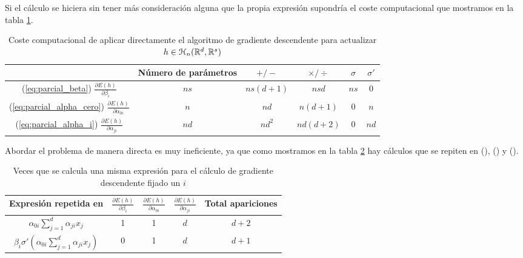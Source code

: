 Si el cálculo se hiciera sin tener más consideración alguna que la propia expresión supondría el coste computacional que mostramos en la tabla \ref{tab:coste-computacional-directa}.

\begin{table}[H]
    \begin{center}
    \begin{tabular}{| c | c | c | c | c | c| }
    \hline
       & Número de parámetros & $+ / -$ & $\times / \div$ & $\sigma$ & $\sigma'$
    \\ \hline
    (\ref{eq:parcial_beta}) $\frac{\partial E(h)}{\partial \beta_i}$ 
    & $n s$ & $n s (d+1)$ & $n s d$ & $n s$ & 0
    \\
    \hline
    (\ref{eq:parcial_alpha_cero}) $\frac{\partial E(h)}{\partial \alpha_{0 i}}$ 
    & $n$ & $n d$ & $n (d + 1)$ & 0 & $n$
    \\
    \hline
    (\ref{eq:parcial_alpha_i}) $\frac{\partial E(h)}{\partial \alpha_{j i}}$ 
    & $n d$ & $n d^2$ & $n d (d + 2)$ & 0 & $n d$
    \\
    \hline
    \end{tabular}
    \caption{Coste computacional de aplicar directamente el  algoritmo de gradiente 
    descendente para actualizar $h \in \mathcal{H}_n(\mathbb{R}^d, \mathbb{R}^s)$}
    \label{tab:coste-computacional-directa}
    \end{center}
\end{table}

Abordar el problema de manera directa es muy ineficiente, ya que como mostramos en la tabla 
\ref{tab:expresiones_repetidas_en_descenso_gradiente}
hay cálculos que se repiten en (), () y  
(). 

\begin{table}[H]
    \begin{center}
    \begin{tabular}{| c | c | c | c | c| }
    \hline
    Expresión  repetida en 
    & $\frac{\partial E(h)}{\partial \beta_i}$ 
    & $\frac{\partial E(h)}{\partial \alpha_{0 i}}$ 
    &$\frac{\partial E(h)}{\partial \alpha_{j i}}$ 
    & Total apariciones 
    \\ \hline
    $\alpha_{0 i} \sum_{j=1}^d \alpha_{j i}x_j$ 
    & 1 & 1& $d$ & $d+2$
    \\
    $\beta_i \sigma'
    \left(  
     \alpha_{0 i} 
     \sum_{j=1}^d \alpha_{j i}x_j
    \right)$
    & 0 & 1 & $d$ & $d+1$
    \\ \hline
    \end{tabular}
    \caption{Veces que se calcula una misma expresión 
    para el cálculo de gradiente descendente fijado un
     $i$}
    \label{tab:expresiones_repetidas_en_descenso_gradiente}
    \end{center}
\end{table}

